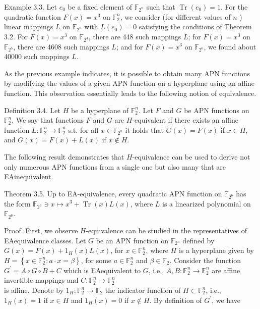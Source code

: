 \documentclass[10pt]{article}
\begin{document}
Example 3.3. Let $e_{0}$ be a fixed element of $\mathbb{F}_{2^{n}}$ such that $\operatorname{Tr}\left(e_{0}\right)=1$. For the quadratic function $F(x)=x^{3}$ on $\mathbb{F}_{2}^{n}$, we consider (for different values of $n$ ) linear mappings $L$ on $\mathbb{F}_{2^{n}}$ with $L\left(e_{0}\right)=0$ satisfying the conditions of Theorem 3.2. For $F(x)=x^{3}$ on $\mathbb{F}_{2^{4}}$, there are 448 such mappings $L$; for $F(x)=x^{3}$ on $\mathbb{F}_{2^{5}}$, there are 4608 such mappings $L$; and for $F(x)=x^{3}$ on $\mathbb{F}_{2^{6}}$, we found about 40000 such mappings $L$.

As the previous example indicates, it is possible to obtain many APN functions by modifying the values of a given APN function on a hyperplane using an affine function. This observation essentially leads to the following notion of equivalence.

Definition 3.4. Let $H$ be a hyperplane of $\mathbb{F}_{2}^{n}$. Let $F$ and $G$ be APN functions on $\mathbb{F}_{2}^{n}$. We say that functions $F$ and $G$ are $H$-equivalent if there exists an affine function $L: \mathbb{F}_{2}^{n} \rightarrow \mathbb{F}_{2}^{n}$ s.t. for all $x \in \mathbb{F}_{2^{n}}$ it holds that $G(x)=F(x)$ if $x \in H$, and $G(x)=F(x)+L(x)$ if $x \notin H$.

The following result demonstrates that $H$-equivalence can be used to derive not only numerous APN functions from a single one but also many that are EAinequivalent.

Theorem 3.5. Up to EA-equivalence, every quadratic APN function on $\mathbb{F}_{2^{6}}$ has the form $\mathbb{F}_{2^{6}} \ni x \mapsto x^{3}+\operatorname{Tr}(x) L(x)$, where $L$ is a linearized polynomial on $\mathbb{F}_{2^{6}}$.

Proof. First, we observe $H$-equivalence can be studied in the representatives of EAequivalence classes. Let $G$ be an APN function on $\mathbb{F}_{2^{n}}$ defined by $G(x)=F(x)+ 1_{H}(x) L(x)$, for $x \in \mathbb{F}_{2}^{n}$, where $H$ is a hyperplane given by $H=\left\{x \in \mathbb{F}_{2}^{n}: a \cdot x=\beta\right\}$, for some $a \in \mathbb{F}_{2}^{n}$ and $\beta \in \mathbb{F}_{2}$. Consider the function $G^{\prime}=A \circ G \circ B+C$ which is EAequivalent to $G$, i.e., $A, B: \mathbb{F}_{2}^{n} \rightarrow \mathbb{F}_{2}^{n}$ are affine invertible mappings and $C: \mathbb{F}_{2}^{n} \rightarrow \mathbb{F}_{2}^{n}$\\
is affine. Denote by $1_{H}: \mathbb{F}_{2}^{n} \rightarrow \mathbb{F}_{2}$ the indicator function of $H \subset \mathbb{F}_{2}^{n}$, i.e., $1_{H}(x)=1$ if $x \in H$ and $1_{H}(x)=0$ if $x \notin H$. By definition of $G^{\prime}$, we have
\end{document}
